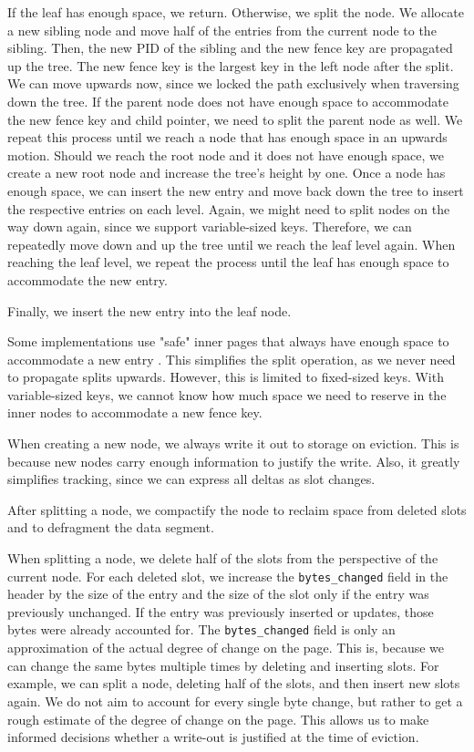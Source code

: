 If the leaf has enough space, we return.
Otherwise, we split the node.
We allocate a new sibling node and move half of the entries from the current node to the sibling.
Then, the new \ac{PID} of the sibling and the new fence key are propagated up the tree.
The new fence key is the largest key in the left node after the split.
We can move upwards now, since we locked the path exclusively when traversing down the tree.
If the parent node does not have enough space to accommodate the new fence key and child pointer, we need to split the parent node as well.
We repeat this process until we reach a node that has enough space in an upwards motion.
Should we reach the root node and it does not have enough space, we create a new root node and increase the tree's height by one.
Once a node has enough space, we can insert the new entry and move back down the tree to insert the respective entries on each level.
Again, we might need to split nodes on the way down again, since we support variable-sized keys.
Therefore, we can repeatedly move down and up the tree until we reach the leaf level again.
When reaching the leaf level, we repeat the process until the leaf has enough space to accommodate the new entry.

Finally, we insert the new entry into the leaf node.

Some implementations use "safe" inner pages that always have enough space to accommodate a new entry \cite{mdbs2024slides}.
This simplifies the split operation, as we never need to propagate splits upwards.
However, this is limited to fixed-sized keys.
With variable-sized keys, we cannot know how much space we need to reserve in the inner nodes to accommodate a new fence key.

When creating a new node, we always write it out to storage on eviction.
This is because new nodes carry enough information to justify the write.
Also, it greatly simplifies tracking, since we can express all deltas as slot changes.

After splitting a node, we compactify the node to reclaim space from deleted slots and to defragment the data segment.

When splitting a node, we delete half of the slots from the perspective of the current node.
For each deleted slot, we increase the \texttt{bytes\_changed} field in the header by the size of the entry and the size of the slot only if the entry was previously unchanged.
If the entry was previously inserted or updates, those bytes were already accounted for.
The \texttt{bytes\_changed} field is only an approximation of the actual degree of change on the page.
This is, because we can change the same bytes multiple times by deleting and inserting slots.
For example, we can split a node, deleting half of the slots, and then insert new slots again.
We do not aim to account for every single byte change, but rather to get a rough estimate of the degree of change on the page.
This allows us to make informed decisions whether a write-out is justified at the time of eviction.

